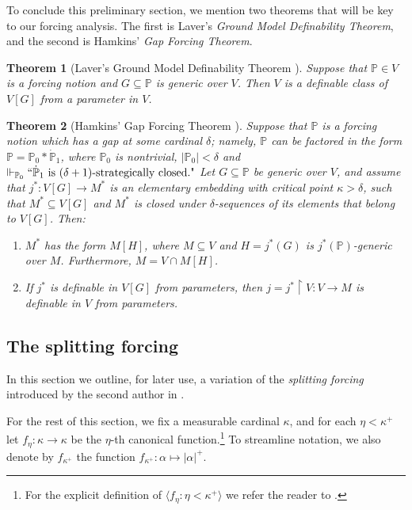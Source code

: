 \documentclass[11pt]{amsart}
\renewcommand{\restriction}{\mathbin\upharpoonright}    %
\newtheorem{theorem}{Theorem}[section]
\theoremstyle{definition}
\theoremstyle{remark}
\newcommand\<{{<}}
\newcommand{\po}{\mathbb{P}}
\newcommand{\la}{\langle}
\newcommand{\ra}{\rangle}
\begin{document}
To conclude this preliminary section, we mention two theorems that will be key to our forcing analysis. The first is Laver’s \emph{Ground Model Definability Theorem}, and the second is Hamkins’ \emph{Gap Forcing Theorem}.

\begin{theorem}[Laver's Ground Model Definability Theorem \cite{Lavergroundmodeldefinability}]\label{thm: Laver ground model definability thm}
    Suppose that $\po\in V$ is a forcing notion and $G\subseteq \po$ is generic over $V$. Then $V$ is a definable class of $V[G]$ from a parameter in $V$.
\end{theorem}

\begin{theorem}[Hamkins' Gap Forcing Theorem \cite{HamkinsGap}]\label{thm: Gap forcing theorem}
    Suppose that $\po$ is a forcing notion which has a gap at some cardinal $\delta$; namely, $\po$ can be factored in the form $\po = \po_0*\dot{\po}_1$, where $\po_0$ is nontrivial,  $|\po_0|<\delta$ and $\Vdash_{\po_0} ``\dot{\po}_1 \text{ is }(\delta+1)\text{-strategically closed."}$ Let $G\subseteq \po$ be generic over $V$, and assume that $j^*\colon V[G]\to M^*$ is an elementary embedding with critical point $\kappa > \delta$, such that $M^*\subseteq V[G]$ and $M^*$ is closed under $\delta$-sequences of its elements that belong to $V[G]$. Then:
		\begin{enumerate}
			\item $M^*$ has the form $M[H]$, where $M\subseteq V$ and $H = j^*(G)$ is $j^*(\po)$-generic over $M$. Furthermore, $M = V\cap M[H]$.
			\item If $j^*$ is definable in $V[G]$ from parameters, then $j = j^*\restriction V\colon V\to M$ is definable in $V$ from parameters. \end{enumerate}
\end{theorem}



\subsection{The splitting forcing}\label{Section: splitting forcing}
		In this section we outline, for later use, a variation of the \emph{splitting forcing} \label{page: splitting forcing} introduced by the second author in \cite{Kaplan}. 
        
        For the rest of this section, we fix a measurable cardinal $\kappa$, and for each $\eta<\kappa^{+}$ let $f_\eta \colon \kappa \to \kappa$ be the $\eta$-th canonical function.\footnote{For the explicit definition of $\la f_\eta \colon \eta<\kappa^+ \ra$ we refer the reader to \cite[Lemma 24.5]{Jech}.} To  streamline notation, we also denote by $f_{\kappa^+}$ the  function $f_{\kappa^+}\colon \alpha \mapsto |\alpha|^+$.
\end{document}
